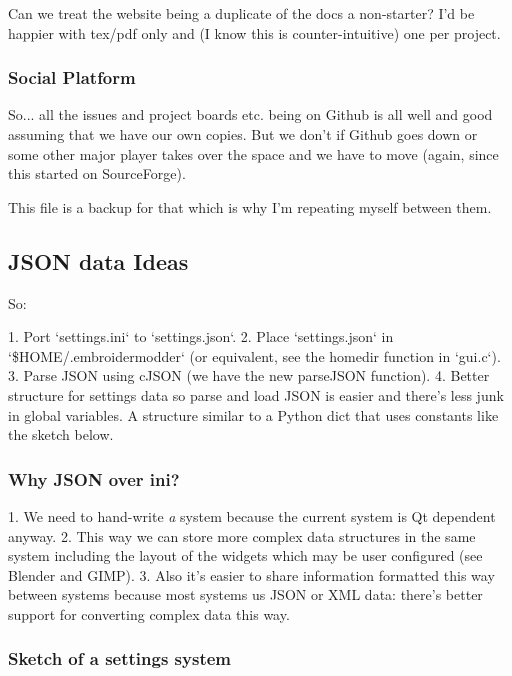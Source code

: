 \documentclass[10pt]{report}
\begin{document}
Can we treat the website being a duplicate of the docs a non-starter?
I'd be happier with tex/pdf only and (I know this is counter-intuitive)
one per project.

\subsubsection{Social Platform}

So... all the issues and project boards etc. being on Github is all
well and good assuming that we have our own copies. But we don't if
Github goes down or some other major player takes over the space and we
have to move (again, since this started on SourceForge).

This file is a backup for that which is why I'm repeating myself between
them.

\subsection{JSON data Ideas}

So:

1. Port `settings.ini` to `settings.json`.
2. Place `settings.json` in `\$HOME/.embroidermodder` (or equivalent, see the homedir function in `gui.c`).
3. Parse JSON using cJSON (we have the new parseJSON function).
4. Better structure for settings data so parse and load JSON is easier and
   there's less junk in global variables. A structure similar to a Python dict
   that uses constants like the sketch below.

\subsubsection{Why JSON over ini?}

1. We need to hand-write \emph{a} system because the current system is Qt dependent anyway.
2. This way we can store more complex data structures in the same system including the layout of the widgets which may be user configured (see Blender and GIMP).
3. Also it's easier to share information formatted this way between systems because most systems us JSON or XML data: there's better support for converting complex data this way.

\subsubsection{Sketch of a settings system}
\end{document}

